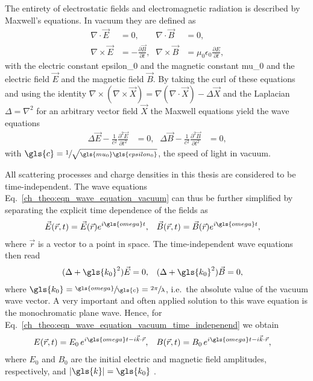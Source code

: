 The entirety of electrostatic fields and electromagnetic radiation is described by Maxwell's equations. In vacuum they are defined as
\begin{align*}
\nabla \cdotp \vec{E} &=0 \text{,} & \nabla \cdotp \vec{B} &=0 \text{,}\\
\nabla \times \vec{E} & = -\frac{\partial \vec{B}}{\partial t}\text{,} & \nabla \times \vec{B} &= \mu_0 \epsilon_0 \frac{\partial E}{\partial t} \text{,}
\end{align*}
with the electric constant \gls{epsilon_0} and the magnetic constant \gls{mu_0} and the electric field $\vec{E}$ and the magnetic field $\vec{B}$. By taking the curl of these equations and using the identity $\nabla \times (\nabla \times \vec{X}) = \nabla (\nabla \cdot \vec{X}) - \Delta \vec{X}$ and the Laplacian $\Delta = \nabla^2$ for an arbitrary vector field $\vec{X}$ the Maxwell equations yield the wave equations
\begin{align}
\Delta \vec{E} - \frac{1}{c^2} \frac{\partial^2 \vec{E}}{\partial t^2} &= 0\text{,}& \Delta \vec{B} - \frac{1}{c^2} \frac{\partial^2 \vec{B}}{\partial t^2} &= 0\text{,} \label{ch_theo:eqn_wave_equation_vacuum}
\end{align}
with $\gls{c} = \sfrac{1}{\sqrt{\gls{mu_0}\gls{epsilon_0}}}$, the speed of light in vacuum.

All scattering processes and charge densities in this thesis are considered to be time-independent. The wave equations Eq.~\eqref{ch_theo:eqn_wave_equation_vacuum} can thus be further simplified by separating the explicit time dependence of the fields as
\begin{align}
\vec{E}(\vec{r},t) &= \vec{E}(\vec{r}) e^{i \gls{omega} t}\text{,} & \vec{B}(\vec{r},t) &= \vec{B}(\vec{r}) e^{i \gls{omega} t}\text{,}
\end{align}
where $\vec{r}$ is a vector to a point in space. The time-independent wave equations then read
\begin{align}
(\Delta  + \gls{k_0}^2 ) \vec{E} &= 0\text{,}& (\Delta  + \gls{k_0}^2 ) \vec{B} &= 0\text{,} \label{ch_theo:eqn_wave_equation_vacuum_time_indepenend}
\end{align}
where $\gls{k_0}= \sfrac{\gls{omega}}{\gls{c}} = \sfrac{2 \pi}{\lambda}$, i.e.~the absolute value of the vacuum wave vector. A very important and often applied solution to this wave equation is the monochromatic plane wave. Hence, for Eq.~\eqref{ch_theo:eqn_wave_equation_vacuum_time_indepenend} we obtain
\begin{align}
E(\vec{r},t) &= E_0 \, e^{i \gls{omega} t - i \vec{k} \cdot \vec{r}}\text{,} & B(\vec{r},t) &= B_0 \, e^{i \gls{omega} t - i \vec{k} \cdot \vec{r}}\text{,} \label{ch_theo:eqn_plain_wave}
\end{align}
where $E_0$ and $B_0$ are the initial electric and magnetic field amplitudes, respectively, and $|\gls{k}| = \gls{k_0}$ \cite{born_principles_1965}.

